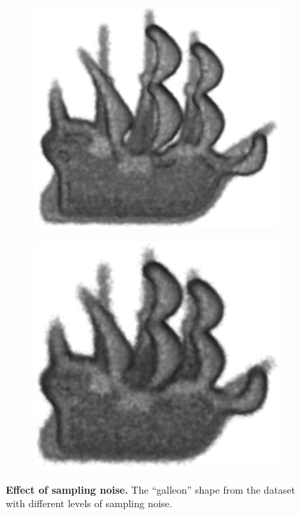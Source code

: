 \begin{figure}[ht]
\begin{subfigure}[t]{0.24\linewidth}
		\label{fig/eval/noise_low}
	\end{subfigure}
	\begin{subfigure}[t]{0.24\linewidth}\centering
		\includegraphics[width=1\linewidth]{./fig/eval/noise_mid.png}
		\label{fig/eval/noise_mid}
	\end{subfigure}
	\begin{subfigure}[t]{0.24\linewidth}\centering
		\includegraphics[width=1\linewidth]{./fig/eval/noise_high.png}
		\label{fig/eval/noise_high}
	\end{subfigure}
	\caption{\textbf{Effect of sampling noise.} The ``galleon'' shape from the \meshset dataset with different levels of sampling noise.}
	\label{fig/eval/noisesample}
\end{figure}

